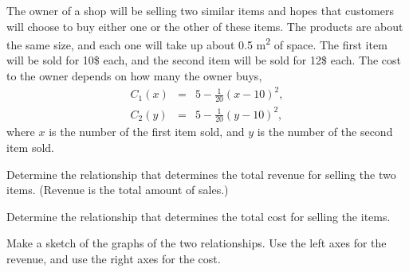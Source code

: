 \begin{problem}
\clearpage

\item The owner of a shop will be selling two similar items and hopes
  that customers will choose to buy either one or the other of these
  items. The products are about the same size, and each one will take
  up about 0.5 m\textsuperscript{2} of space. The first item will be
  sold for 10\$ each, and the second item will be sold for 12\$
  each. The cost to the owner depends on how many the owner buys,
  \begin{eqnarray*}
    C_1(x) & = & 5 - \frac{1}{20}(x-10)^2, \\
    C_2(y) & = & 5 - \frac{1}{20}(y-10)^2,
  \end{eqnarray*}
  where $x$ is the number of the first item sold, and $y$ is the
  number of the second item sold.


  \begin{subproblem}
    
  \item Determine the relationship that determines the total revenue
    for selling the two items. (Revenue is the total amount of sales.)

    \vfill

  \item Determine the relationship that determines the total cost for
    selling the items.

    \vfill

  \item Make a sketch of the graphs of the two relationships. Use the
    left axes for the revenue, and use the right axes for the cost.


\end{subproblem}
\end{problem}
